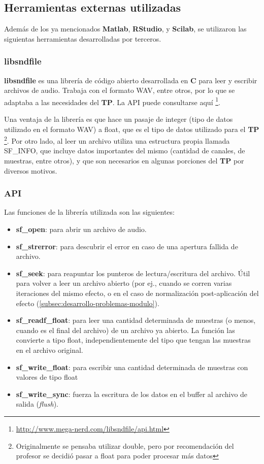 \subsection{Herramientas externas utilizadas}
\label{subsec:herramientas}
Además de los ya mencionados \textbf{Matlab}, \textbf{RStudio}, y \textbf{Scilab}, se utilizaron las siguientas herramientas desarrolladas por terceros.

\subsubsection{libsndfile}
\label{subsec:libsndfile}
\textbf{libsndfile} es una librería de código abierto desarrollada en \textbf{C} para leer y escribir archivos de audio. Trabaja con el formato WAV, entre otros, por lo que se adaptaba a las necesidades del \textbf{TP}. La API puede consultarse aquí \footnote{\url{http://www.mega-nerd.com/libsndfile/api.html}}.\vspace{\baselineskip}

Una ventaja de la librería es que hace un pasaje de integer (tipo de datos utilizado en el formato WAV) a float, que es el tipo de datos utilizado para el \textbf{TP} \footnote{Originalmente se pensaba utilizar double, pero por recomendación del profesor se decidió pasar a float para poder procesar más datos}. Por otro lado, al leer un archivo utiliza una estructura propia llamada SF\_INFO, que incluye datos importantes del mismo (cantidad de canales, de muestras, entre otros), y que son necesarios en algunas porciones del \textbf{TP} por diversos motivos.

\subsubsection*{API}
\label{subsec:libsndfile-api}
Las funciones de la librería utilizada son las siguientes:

\begin{itemize}
 \item \textbf{sf\_open}: para abrir un archivo de audio. 
 \item \textbf{sf\_strerror}: para descubrir el error en caso de una apertura fallida de archivo.
 \item \textbf{sf\_seek}: para reapuntar los punteros de lectura/escritura del archivo. Útil para volver a leer un archivo abierto (por ej., cuando se corren varias iteraciones del mismo efecto, o en el caso de normalización post-aplicación del efecto (\ref{subsec:desarrollo-problemas-modulo}).
 \item \textbf{sf\_readf\_float}: para leer una cantidad determinada de muestras (o menos, cuando es el final del archivo) de un archivo ya abierto. La función las convierte a tipo float, independientemente del tipo que tengan las muestras en el archivo original.
 \item \textbf{sf\_write\_float}: para escribir una cantidad determinada de muestras con valores de tipo float
 \item \textbf{sf\_write\_sync}: fuerza la escritura de los datos en el buffer al archivo de salida (\textit{flush}).
\end{itemize}


